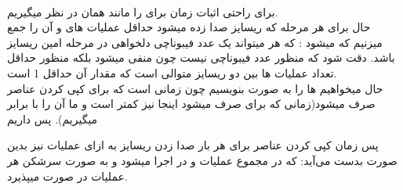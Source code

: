 \documentclass[11pt]{letter}
\begin{document}
\begin{RTL}
								\\ برای راحتی اثبات زمان 
																برای 
																را مانند 
			همان 
			در نظر میگیریم.\\
			حال برای هر مرحله که ریسایز صدا زده میشود حداقل عملیات های
			و
			 آن را جمع میزنیم که میشود :
			که هر
			میتواند یک عدد فیبوناچی دلخواهی در مرحله 
			 امین ریسایز باشد. دقت شود که منظور عدد فیبوناچی  
			 						نیست چون منفی میشود بلکه منظور حداقل تعداد عملیات ها بین دو ریسایز متوالی است که مقدار آن حداقل 1 است.
			 						\\
			حال میخواهیم 
									ها را به صورت 
			بنویسیم چون زمانی است که برای کپی کردن عناصر صرف میشود(زمانی که برای 
			صرف میشود اینجا نیز کمتر است و ما آن را با 
			برابر میگیریم).
پس داریم 
			
			پس زمان کپی کردن عناصر برای هر بار صدا زدن ریسایز به ازای 
		عملیات نیز بدین صورت بدست می‌آید:
			که در مجموع 
						عملیات 
			و
						در 
						اجرا میشود
					و به صورت سرشکن هر عملیات در 
					صورت میپذیرد.
				\end{RTL}
\end{document}

